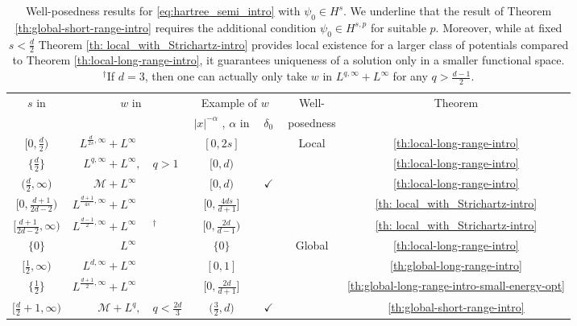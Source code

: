 \documentclass[12pt]{article}
\theoremstyle{plain}
\newcommand{\gcell}{\cellcolor{mylightgreen}}
\newcommand{\rcell}{\cellcolor{mylightred}}
\newcommand{\bcell}{\cellcolor{mylightblue}}
\newcommand{\meas}{\mathcal{M}}
\begin{document}
\begin{table}[H]
    \centering
\begin{tabular}{c|rl|c|c|c|c}
\multirow{2}{*}{$s$ in} & \multirow{2}{*}{$w$ in} &  & \multicolumn{2}{c|}{Example of $w$} & Well- & \multirow{2}{*}{Theorem}\tabularnewline
\cline{4-5} \cline{5-5} 
 &  &  & $|x|^{-\alpha}$ , $\alpha$ in & $\;\delta_{0}\;$ & posedness & \tabularnewline
\hline 
\rcell$\big[0,\frac{d}{2}\big)$  & \rcell$L^{\frac{d}{2s},\infty}+L^{\infty}\phantom{,}$  & \rcell & $[0,2s]$\rcell & \rcell & \multirow{5}{*}{Local} & \rcell\ref{th:local-long-range-intro}\tabularnewline
\rcell$\big\{\frac{d}{2}\big\}$  & \rcell$L^{q,\infty}+L^{\infty},$  & \negthickspace{}\negthickspace{}$q>1$\rcell & $[0,d)$\rcell & \rcell &  & \rcell\ref{th:local-long-range-intro}\tabularnewline
\rcell$\big(\frac{d}{2},\infty\big)$ & \rcell$\meas+L^{\infty}\phantom{,}$  & \rcell & $[0,d)$\rcell & $\checkmark$ \rcell &  & \rcell\ref{th:local-long-range-intro}\tabularnewline
\bcell$\big[0,\frac{d+1}{2d-2}\big)$ & \bcell$L^{\frac{d+1}{4s},\infty}+L^{\infty}\phantom{,}$  & \bcell & $\big[0,\frac{4ds}{d+1}\big]$\bcell & \bcell &  & \bcell\ref{th: local_with_Strichartz-intro}\tabularnewline
\bcell$\big[\frac{d+1}{2d-2},\infty\big)$ & \bcell$L^{\frac{d-1}{2},\infty}+L^{\infty}\phantom{,}$  & $^{\dagger}$\bcell & $\big[0,\frac{2d}{d-1}\big)$\bcell & \bcell &  & \bcell\ref{th: local_with_Strichartz-intro} \tabularnewline
\cline{6-6} 
\rcell$\{0\}$  & \rcell$L^{\infty}\phantom{,}$  & \rcell & \rcell$\{0\}$ & \rcell & \multirow{4}{*}{Global} & \rcell\ref{th:local-long-range-intro}\tabularnewline
\rcell$\big[\frac{1}{2},\infty\big)$ & \rcell$L^{d,\infty}+L^{\infty}\phantom{,}$  & \rcell & \rcell$[0,1]$ & \rcell &  & \rcell\ref{th:global-long-range-intro}\tabularnewline
\bcell$\big\{\frac{1}{2}\big\}$  & \bcell$L^{\frac{d+1}{2},\infty}+L^{\infty}\phantom{,}$  & \bcell & \bcell$\big[0,\frac{2d}{d+1}\big]$ & \bcell &  & \bcell\ref{th:global-long-range-intro-small-energy-opt}\tabularnewline
\gcell$\big[\frac{d}{2}+1,\infty\big)$ & \gcell$\meas+L^{q},$  & \negthickspace{}\negthickspace{}$q<\frac{2d}{3}$\gcell & \gcell$\big(\frac{3}{2},d\big)$ & \gcell$\checkmark$  &  & \gcell\ref{th:global-short-range-intro}\tabularnewline
\end{tabular}\caption{Well-posedness results for \eqref{eq:hartree_semi_intro} with
$\psi_{0}\in H^{s}$. We underline that the result of Theorem \ref{th:global-short-range-intro}
requires the additional condition $\psi_{0}\in H^{s,p}$ for suitable
$p$. Moreover, while at fixed $s<\frac{d}{2}$ Theorem \ref{th: local_with_Strichartz-intro}
provides local existence for a larger class of potentials compared
to Theorem \ref{th:local-long-range-intro}, it guarantees uniqueness
of a solution only in a smaller functional space.\protect \\
$^{\dagger}$If $d=3$, then one can actually only take $w$
in $L^{q,\infty}+L^{\infty}$ for any $q>\frac{d-1}{2}$.}
	\label{tab: exist}
\end{table}
\end{document}

